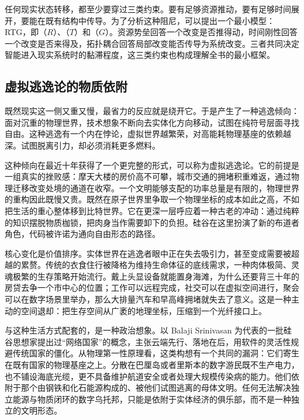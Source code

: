 任何现实状态转移，都至少要穿过三类约束。要有足够资源推动，要有足够时间展开，要能在既有结构中传导。为了分析这种阻尼，可以提出一个最小模型：RTG，即（$R$）、（$T$）和（$G$）。资源势垒回答一个改变是否推得动，时间刚性回答一个改变是否来得及，拓扑耦合回答局部改变能否传导为系统改变。三者共同决定智能进入现实系统时的黏滞程度，这三类约束也构成理解全书的最小框架。

\subsection{虚拟逃逸论的物质依附}


既然现实这一侧又重又慢，最省力的反应就是绕开它。于是产生了一种逃逸倾向：面对沉重的物理世界，技术想象不断向去实体化方向移动，试图在纯符号层面寻找自由。这种逃逸有一个内在悖论，虚拟世界越繁荣，对高能耗物理基座的依赖越深。试图脱离引力，却必须消耗更多燃料。

这种倾向在最近十年获得了一个更完整的形式，可以称为虚拟逃逸论。它的前提是一组真实的挫败感：摩天大楼的房价高不可攀，城市交通的拥堵积重难返，通过物理迁移改变处境的通道在收窄。一个文明能够支配的功率总量是有限的，物理世界的重构因此既慢又贵。既然在原子世界里争取一个物理坐标的成本如此之高，不如把生活的重心整体移到比特世界。它在更深一层呼应着一种古老的冲动：通过纯粹的知识摆脱物质枷锁，把肉身当作需要卸下的负担。硅谷在这里扮演了新的布道者角色，代码被许诺为通向自由形态的路径。

核心变化是价值排序。实体世界在逃逸者眼中正在失去吸引力，甚至变成需要被超越的累赘。传统的衣食住行被降格为维持生命体征的底线需求，一种肉体极简、灵魂极繁的生存策略开始流行。戴上头显设备就能置身海滩，为什么还要背三十年的房贷去争一个市中心的位置；工作可以远程完成，社交可以在虚拟空间进行，聚会可以在数字场景里举办，那么大排量汽车和早高峰拥堵就失去了意义。这是一种主动的空间退却：把生存空间从广袤的地理坐标，压缩到一个光纤接口上。

与这种生活方式配套的，是一种政治想象。以 Balaji Srinivasan 为代表的一批硅谷思想家提出过“网络国家”的概念，主张云端先行、落地在后，用软件的灵活性规避传统国家的僵化。从物理第一性原理看，这类构想有一个共同的漏洞：它们寄生在既有国家的物理基座之上。分散在巴厘岛或者里斯本的数字游民既不生产电力，也不铺设海底光缆，更不具备维护航道安全或者处理大规模传染病的能力。他们依附于那个由钢铁和化石能源构成的、被他们试图逃离的母体文明。任何无法解决独立能源与物质闭环的数字乌托邦，只能是依附于实体经济的俱乐部，而不是一种独立的文明形态。


